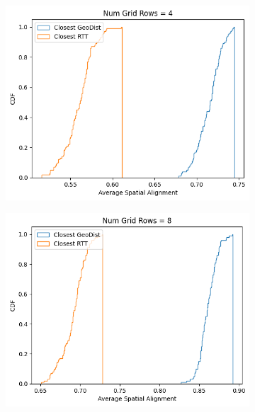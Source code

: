 \begin{figure}
\centering
\begin{subfigure}{0.45\textwidth}
  \centering
  \includegraphics[width=\linewidth]{figures/mechanisms/spatial_ctx_mgmt/spatial_alignment_randomized_4_rows.png}
  \caption{}
\end{subfigure}%
\begin{subfigure}{0.45\textwidth}
  \centering
  \includegraphics[width=\linewidth]{figures/mechanisms/spatial_ctx_mgmt/spatial_alignment_randomized_8_rows.png}
  \caption{}
\end{subfigure}\par\medskip

\end{figure}
